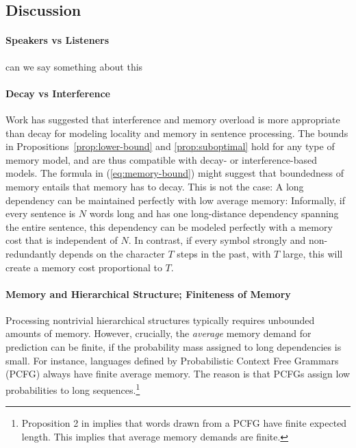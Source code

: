 \documentclass[11pt,letterpaper]{article}
\begin{document}
\subsection{Discussion}

\paragraph{Speakers vs Listeners}
can we say something about this

\paragraph{Decay vs Interference}
Work has suggested that interference and memory overload is more appropriate than decay \cite[p. 408]{lewis-activation-based-2005} for modeling locality and memory in sentence processing.
The bounds in Propositions~\ref{prop:lower-bound} and \ref{prop:suboptimal} hold for any type of memory model, and are thus compatible with decay- or interference-based models.
The formula in (\ref{eq:memory-bound}) might suggest that boundedness of memory entails that memory has to decay.
This is not the case:
A long dependency can be maintained perfectly with low average memory:
Informally, if every sentence is $N$ words long and has one long-distance dependency spanning the entire sentence, this dependency can be modeled perfectly with a memory cost that is independent of $N$.
In contrast, if every symbol strongly and non-redundantly depends on the character $T$ steps in the past, with $T$ large, this will create a memory cost proportional to $T$.




\paragraph{Memory and Hierarchical Structure; Finiteness of Memory}
Processing nontrivial hierarchical structures typically requires unbounded amounts of memory.
However, crucially, the \emph{average} memory demand for prediction can be finite, if the probability mass assigned to long dependencies is small.
For instance, languages defined by Probabilistic Context Free Grammars (PCFG) always have finite average memory.
The reason is that PCFGs assign low probabilities to long sequences.\footnote{Proposition 2 in \cite{chi-statistical-1999} implies that words drawn from a PCFG have finite expected length. This implies that average memory demands are finite.}
\end{document}
